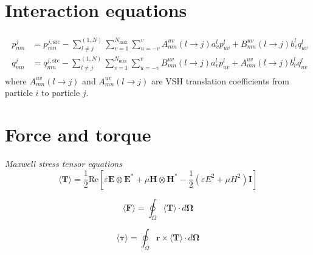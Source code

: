 \documentclass[11pt]{article}
\begin{document}
\section{Interaction equations}
\begin{align}
    \begin{split}
        p_{mn}^j &= p_{mn}^{j,\text{src}}  -  \sum_{l \neq j}^{(1,N)}\sum_{v=1}^{N_\text{max}} \sum_{u=-v}^{v}
    A_{mn}^{uv}(l \rightarrow j) a_v^l p_{uv}^{l}
    +B_{mn}^{uv}(l \rightarrow j) b_v^l q_{uv}^{l} \\
    q_{mn}^j &= q_{mn}^{j,\text{src}}  -  \sum_{l \neq j}^{(1,N)}\sum_{v=1}^{N_\text{max}} \sum_{u=-v}^{v}
    B_{mn}^{uv}(l \rightarrow j) a_v^l p_{uv}^{l}
    +A_{mn}^{uv}(l \rightarrow j) b_v^l q_{uv}^{l}
    \label{eqn:gmt_system}
    \end{split}
\end{align}
where $A_{mn}^{uv}(l \rightarrow j)$ and $A_{mn}^{uv}(l \rightarrow j)$ are VSH translation coefficients from particle $i$ to particle $j$.

\section{Force and torque}
\emph{Maxwell stress tensor equations}
\begin{equation}
    \langle \boldsymbol{T} \rangle = \frac{1}{2} \text{Re} \left[ \varepsilon  \boldsymbol{E} \otimes \boldsymbol{E^*} + \mu \boldsymbol{H} \otimes \boldsymbol{H^*}
    - \frac{1}{2}(\varepsilon E^2 + \mu H^2)\boldsymbol{I} \right]
\end{equation}

\begin{equation}
    \langle \boldsymbol{F} \rangle = \oint_\Omega \langle \boldsymbol{T} \rangle \cdot d \boldsymbol{\Omega}
\end{equation}

\begin{equation}
    \langle \boldsymbol{\tau} \rangle = \oint_\Omega \boldsymbol{r} \times \langle \boldsymbol{T}  \rangle \cdot d \boldsymbol{\Omega}
\end{equation}
\end{document}
